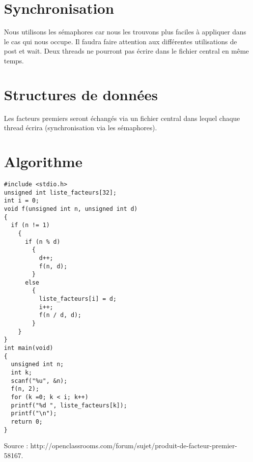 \documentclass[11pt,a4paper]{article}
\begin{document}
\section{Synchronisation}
Nous utilisons les sémaphores car nous les trouvons plus faciles à appliquer dans le cas qui nous occupe. Il faudra faire attention aux différentes utilisations de post et wait. Deux threads ne pourront pas écrire dans le fichier central en même temps.
\section{Structures de données}
Les facteurs premiers seront échangés via un fichier central dans lequel chaque thread écrira (synchronisation via les sémaphores). 
\section{Algorithme}
\begin{lstlisting}
#include <stdio.h>
unsigned int liste_facteurs[32];
int i = 0;
void f(unsigned int n, unsigned int d)
{
  if (n != 1)
    {
      if (n % d)
        {
          d++;
          f(n, d);
        }
      else
        {
          liste_facteurs[i] = d;
          i++;
          f(n / d, d);
        }
    }
}
int main(void)
{
  unsigned int n;
  int k;
  scanf("%u", &n);
  f(n, 2);
  for (k =0; k < i; k++)
  printf("%d ", liste_facteurs[k]);
  printf("\n");
  return 0;
}
\end{lstlisting}
Source : http://openclassrooms.com/forum/sujet/produit-de-facteur-premier-58167.
\end{document}
